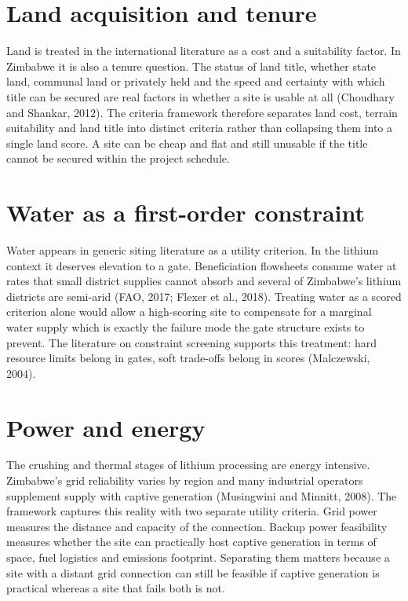 \documentclass[12pt,a4paper]{report}
\begin{document}
\section{Land acquisition and tenure}
Land is treated in the international literature as a cost and a
suitability factor. In Zimbabwe it is also a tenure question. The
status of land title, whether state land, communal land or privately
held and the speed and certainty with which title can be secured are
real factors in whether a site is usable at all (Choudhary and
Shankar, 2012). The criteria framework therefore separates land cost,
terrain suitability and land title into distinct criteria rather than
collapsing them into a single land score. A site can be cheap and flat
and still unusable if the title cannot be secured within the project
schedule.

\section{Water as a first-order constraint}
Water appears in generic siting literature as a utility criterion. In
the lithium context it deserves elevation to a gate. Beneficiation
flowsheets consume water at rates that small district supplies cannot
absorb and several of Zimbabwe's lithium districts are semi-arid
(FAO, 2017; Flexer et al., 2018). Treating water as a scored
criterion alone would allow a high-scoring site to compensate for a
marginal water supply which is exactly the failure mode the gate
structure exists to prevent. The literature on constraint screening
supports this treatment: hard resource limits belong in gates, soft
trade-offs belong in scores (Malczewski, 2004).

\section{Power and energy}
The crushing and thermal stages of lithium processing are energy
intensive. Zimbabwe's grid reliability varies by region and many
industrial operators supplement supply with captive generation
(Musingwini and Minnitt, 2008). The framework captures this reality
with two separate utility criteria. Grid power measures the distance
and capacity of the connection. Backup power feasibility measures
whether the site can practically host captive generation in terms of
space, fuel logistics and emissions footprint. Separating them matters
because a site with a distant grid connection can still be feasible if
captive generation is practical whereas a site that fails both is not.
\end{document}
